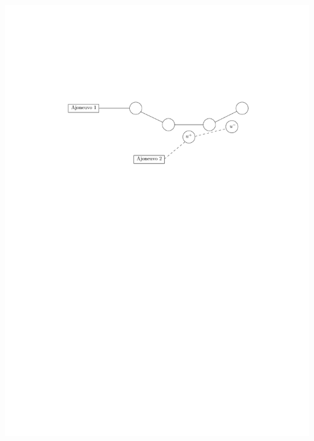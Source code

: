\documentclass{beamer}
\begin{document}
\begin{frame}
  \vfill
  \begin{minipage}{\textwidth}
    \centering
\includegraphics[scale=0.5]{valinta04}
  \end{minipage}
  
  \end{frame}
    
\end{document}
